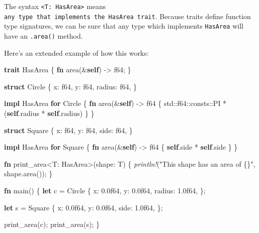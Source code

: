 \documentclass[a4paper,]{book}
\newenvironment{Shaded}{\begin{snugshade}}{\end{snugshade}}
\newcommand{\KeywordTok}[1]{\textcolor[rgb]{0.13,0.29,0.53}{\textbf{{#1}}}}
\newcommand{\DataTypeTok}[1]{\textcolor[rgb]{0.13,0.29,0.53}{{#1}}}
\newcommand{\DecValTok}[1]{\textcolor[rgb]{0.00,0.00,0.81}{{#1}}}
\newcommand{\StringTok}[1]{\textcolor[rgb]{0.31,0.60,0.02}{{#1}}}
\newcommand{\PreprocessorTok}[1]{\textcolor[rgb]{0.56,0.35,0.01}{\textit{{#1}}}}
\newcommand{\NormalTok}[1]{{#1}}
\begin{document}
The syntax \texttt{\textless{}T:\ HasArea\textgreater{}} means
\texttt{any\ type\ that\ implements\ the\ HasArea\ trait}. Because
traits define function type signatures, we can be sure that any type
which implements \texttt{HasArea} will have an \texttt{.area()} method.

Here's an extended example of how this works:

\begin{Shaded}
\begin{Highlighting}[]
\KeywordTok{trait} \NormalTok{HasArea \{}
    \KeywordTok{fn} \NormalTok{area(&}\KeywordTok{self}\NormalTok{) -> }\DataTypeTok{f64}\NormalTok{;}
\NormalTok{\}}

\KeywordTok{struct} \NormalTok{Circle \{}
    \NormalTok{x: }\DataTypeTok{f64}\NormalTok{,}
    \NormalTok{y: }\DataTypeTok{f64}\NormalTok{,}
    \NormalTok{radius: }\DataTypeTok{f64}\NormalTok{,}
\NormalTok{\}}

\KeywordTok{impl} \NormalTok{HasArea }\KeywordTok{for} \NormalTok{Circle \{}
    \KeywordTok{fn} \NormalTok{area(&}\KeywordTok{self}\NormalTok{) -> }\DataTypeTok{f64} \NormalTok{\{}
        \NormalTok{std::}\DataTypeTok{f64}\NormalTok{::consts::PI * (}\KeywordTok{self}\NormalTok{.radius * }\KeywordTok{self}\NormalTok{.radius)}
    \NormalTok{\}}
\NormalTok{\}}

\KeywordTok{struct} \NormalTok{Square \{}
    \NormalTok{x: }\DataTypeTok{f64}\NormalTok{,}
    \NormalTok{y: }\DataTypeTok{f64}\NormalTok{,}
    \NormalTok{side: }\DataTypeTok{f64}\NormalTok{,}
\NormalTok{\}}

\KeywordTok{impl} \NormalTok{HasArea }\KeywordTok{for} \NormalTok{Square \{}
    \KeywordTok{fn} \NormalTok{area(&}\KeywordTok{self}\NormalTok{) -> }\DataTypeTok{f64} \NormalTok{\{}
        \KeywordTok{self}\NormalTok{.side * }\KeywordTok{self}\NormalTok{.side}
    \NormalTok{\}}
\NormalTok{\}}

\KeywordTok{fn} \NormalTok{print_area<T: HasArea>(shape: T) \{}
    \PreprocessorTok{println!}\NormalTok{(}\StringTok{"This shape has an area of \{\}"}\NormalTok{, shape.area());}
\NormalTok{\}}

\KeywordTok{fn} \NormalTok{main() \{}
    \KeywordTok{let} \NormalTok{c = Circle \{}
        \NormalTok{x: }\DecValTok{0.0f64}\NormalTok{,}
        \NormalTok{y: }\DecValTok{0.0f64}\NormalTok{,}
        \NormalTok{radius: }\DecValTok{1.0f64}\NormalTok{,}
    \NormalTok{\};}

    \KeywordTok{let} \NormalTok{s = Square \{}
        \NormalTok{x: }\DecValTok{0.0f64}\NormalTok{,}
        \NormalTok{y: }\DecValTok{0.0f64}\NormalTok{,}
        \NormalTok{side: }\DecValTok{1.0f64}\NormalTok{,}
    \NormalTok{\};}

    \NormalTok{print_area(c);}
    \NormalTok{print_area(s);}
\NormalTok{\}}
\end{Highlighting}
\end{Shaded}
\end{document}
